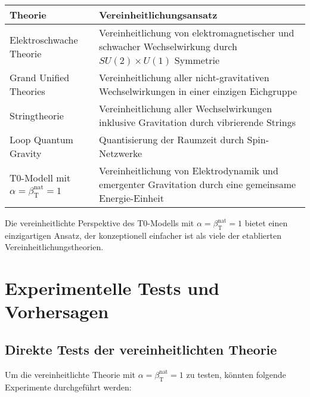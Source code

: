 \documentclass[12pt,a4paper]{article}
\newcommand{\betaT}{\beta_{\text{T}}}
\begin{document}
	\begin{tcolorbox}[colback=blue!5!white,colframe=blue!75!black,title=Vergleich mit anderen Vereinheitlichungstheorien]
		\begin{tabular}{>{\raggedright\arraybackslash}p{3cm}|>{\raggedright\arraybackslash}p{8cm}}
			\textbf{Theorie} & \textbf{Vereinheitlichungsansatz} \\
			\hline
			Elektroschwache Theorie & Vereinheitlichung von elektromagnetischer und schwacher Wechselwirkung durch \(SU(2) \times U(1)\) Symmetrie \\
			\hline
			Grand Unified Theories & Vereinheitlichung aller nicht-gravitativen Wechselwirkungen in einer einzigen Eichgruppe \\
			\hline
			Stringtheorie & Vereinheitlichung aller Wechselwirkungen inklusive Gravitation durch vibrierende Strings \\
			\hline
			Loop Quantum Gravity & Quantisierung der Raumzeit durch Spin-Netzwerke \\
			\hline
			T0-Modell mit \(\alpha = \betaT^{\text{nat}} = 1\) & Vereinheitlichung von Elektrodynamik und emergenter Gravitation durch eine gemeinsame Energie-Einheit \\
		\end{tabular}
	\end{tcolorbox}
	
	Die vereinheitlichte Perspektive des T0-Modells mit \(\alpha = \betaT^{\text{nat}} = 1\) bietet einen einzigartigen Ansatz, der konzeptionell einfacher ist als viele der etablierten Vereinheitlichungstheorien.
	
	\section{Experimentelle Tests und Vorhersagen}
	
	\subsection{Direkte Tests der vereinheitlichten Theorie}
	
	Um die vereinheitlichte Theorie mit \(\alpha = \betaT^{\text{nat}} = 1\) zu testen, könnten folgende Experimente durchgeführt werden:
	
\end{document}
